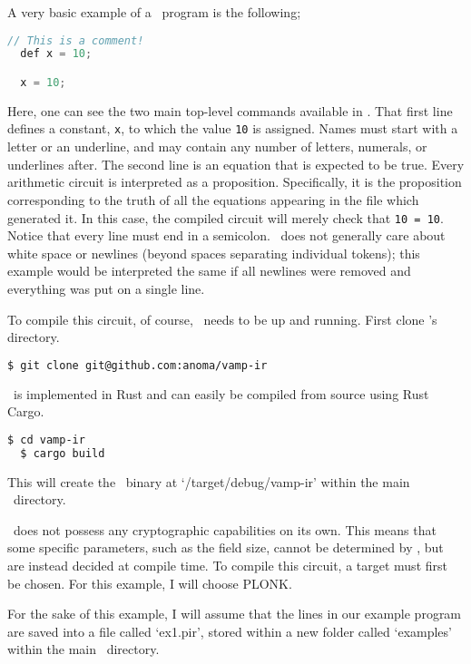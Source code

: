 A very basic example of a \vampir\ program is the following;

\begin{lstlisting}[language=c]
  // This is a comment!
  def x = 10;

  x = 10;
\end{lstlisting}

Here, one can see the two main top-level commands available in \vampir. That first line defines a constant, \lstinline{x}, to which the value \lstinline{10} is assigned. Names must start with a letter or an underline, and may contain any number of letters, numerals, or underlines after. The second line is an equation that is expected to be true. Every arithmetic circuit is interpreted as a proposition. Specifically, it is the proposition corresponding to the truth of all the equations appearing in the file which generated it. In this case, the compiled circuit will merely check that \lstinline{10 = 10}. Notice that every line must end in a semicolon. \vampir\ does not generally care about white space or newlines (beyond spaces separating individual tokens); this example would be interpreted the same if all newlines were removed and everything was put on a single line.

To compile this circuit, of course, \vampir\ needs to be up and running. First clone \vampir's directory.

\begin{lstlisting}[language=bash]
  $ git clone git@github.com:anoma/vamp-ir
\end{lstlisting}

\vampir\ is implemented in Rust and can easily be compiled from source using Rust Cargo.

\begin{lstlisting}[language=bash]
  $ cd vamp-ir
  $ cargo build
\end{lstlisting}

This will create the \vampir\ binary at `/target/debug/vamp-ir' within the main \vampir\ directory.

\vampir\ does not possess any cryptographic capabilities on its own. This means that some specific parameters, such as the field size, cannot be determined by \vampir, but are instead decided at compile time. To compile this circuit, a target must first be chosen. For this example, I will choose PLONK.

For the sake of this example, I will assume that the lines in our example program are saved into a file called `ex1.pir', stored within a new folder called `examples' within the main \vampir\ directory. 

